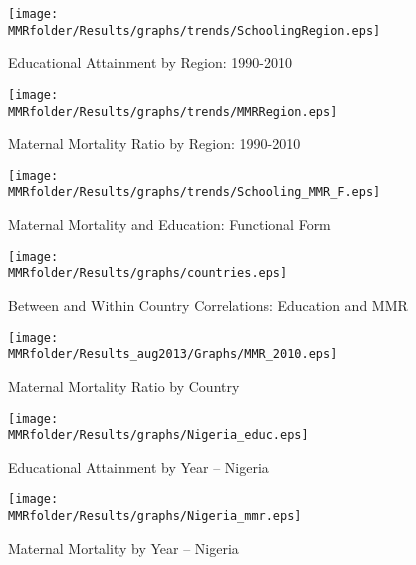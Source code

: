 \begin{figure}[h!]
\begin{center}
\caption{Educational Attainment by Region: 1990-2010}
\label{fig:EducRegion}
\texttt{[image: \\MMRfolder/Results/graphs/trends/SchoolingRegion.eps]} 
\end{center}
\end{figure}

\begin{figure}[h!]
\begin{center}
\caption{Maternal Mortality Ratio by Region: 1990-2010}
\label{fig:MMRRegion}
\texttt{[image: \\MMRfolder/Results/graphs/trends/MMRRegion.eps]} 
\end{center}
\end{figure}

\begin{figure}[h!]
\begin{center}
\caption{Maternal Mortality and Education: Functional Form}
\label{fig:educmmr}
\texttt{[image: \\MMRfolder/Results/graphs/trends/Schooling\_MMR\_F.eps]} 
\end{center}
\end{figure}

\begin{figure}[h!]
\begin{center}
\caption{Between and Within Country Correlations: Education and MMR}
\label{fig:arrows}
\texttt{[image: \\MMRfolder/Results/graphs/countries.eps]} 
\end{center}
\end{figure}


\begin{landscape}
\begin{figure}[h!]
\begin{center}
\caption{Maternal Mortality Ratio by Country}
\label{fig:MMRGlobal}
\texttt{[image: \\MMRfolder/Results\_aug2013/Graphs/MMR\_2010.eps]} 
\end{center}
\end{figure}
\end{landscape}


\begin{subfigures}
\begin{figure}[h!]
\begin{center}
\caption{Educational Attainment by Year -- Nigeria}
\label{fig:Nigeriaeduc}
\texttt{[image: \\MMRfolder/Results/graphs/Nigeria\_educ.eps]} 
\end{center}
\end{figure}

\begin{figure}[h!]
\begin{center}
\caption{Maternal Mortality by Year -- Nigeria}
\label{fig:Nigeriammr}
\texttt{[image: \\MMRfolder/Results/graphs/Nigeria\_mmr.eps]} 
\end{center}
\end{figure}
\end{subfigures}


